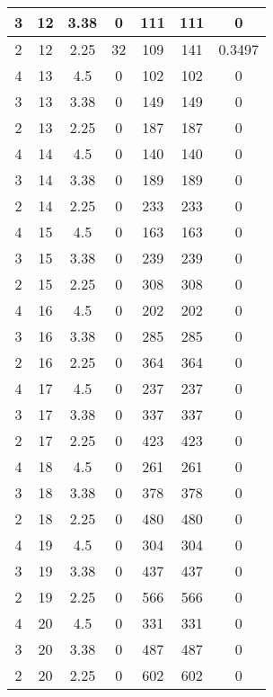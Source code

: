 \documentclass[letterpaper, 12pt]{article}
\begin{document}
\begin{longtable}{|c|c|c|c|c|c|c|}
\hline
3 & 12 & 3.38 & 0 & 111 & 111 & 0 \\
\hline
2 & 12 & 2.25 & 32 & 109 & 141 & 0.3497 \\
\hline
4 & 13 & 4.5 & 0 & 102 & 102 & 0 \\
\hline
3 & 13 & 3.38 & 0 & 149 & 149 & 0 \\
\hline
2 & 13 & 2.25 & 0 & 187 & 187 & 0 \\
\hline
4 & 14 & 4.5 & 0 & 140 & 140 & 0 \\
\hline
3 & 14 & 3.38 & 0 & 189 & 189 & 0 \\
\hline
2 & 14 & 2.25 & 0 & 233 & 233 & 0 \\
\hline
4 & 15 & 4.5 & 0 & 163 & 163 & 0 \\
\hline
3 & 15 & 3.38 & 0 & 239 & 239 & 0 \\
\hline
2 & 15 & 2.25 & 0 & 308 & 308 & 0 \\
\hline
4 & 16 & 4.5 & 0 & 202 & 202 & 0 \\
\hline
3 & 16 & 3.38 & 0 & 285 & 285 & 0 \\
\hline
2 & 16 & 2.25 & 0 & 364 & 364 & 0 \\
\hline
4 & 17 & 4.5 & 0 & 237 & 237 & 0 \\
\hline
3 & 17 & 3.38 & 0 & 337 & 337 & 0 \\
\hline
2 & 17 & 2.25 & 0 & 423 & 423 & 0 \\
\hline
4 & 18 & 4.5 & 0 & 261 & 261 & 0 \\
\hline
3 & 18 & 3.38 & 0 & 378 & 378 & 0 \\
\hline
2 & 18 & 2.25 & 0 & 480 & 480 & 0 \\
\hline
4 & 19 & 4.5 & 0 & 304 & 304 & 0 \\
\hline
3 & 19 & 3.38 & 0 & 437 & 437 & 0 \\
\hline
2 & 19 & 2.25 & 0 & 566 & 566 & 0 \\
\hline
4 & 20 & 4.5 & 0 & 331 & 331 & 0 \\
\hline
3 & 20 & 3.38 & 0 & 487 & 487 & 0 \\
\hline
2 & 20 & 2.25 & 0 & 602 & 602 & 0 \\
\hline
\end{longtable}
\end{document}
